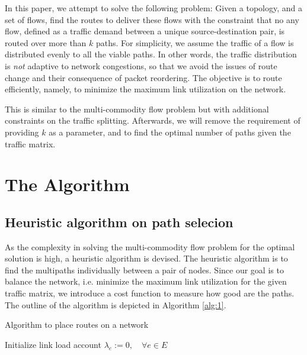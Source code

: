 \documentclass[conference]{IEEEtran}
\begin{document}
In this paper, we attempt to solve the following problem: Given a topology, and
a set of flows, find the routes to deliver these flows with the constraint that
no any flow, defined as a traffic demand between a unique source-destination
pair, is routed over more than $k$ paths. For simplicity, we assume the traffic
of a flow is distributed evenly to all the viable paths. In other words, the
traffic distribution is \emph{not} adaptive to network congestions, so that we
avoid the issues of route change and their consequence of packet reordering.
The objective is to route efficiently, namely, to minimize the maximum link
utilization on the network.

This is similar to the multi-commodity flow problem \cite{pm04} but with
additional constraints on the traffic splitting. Afterwards, we will remove the
requirement of providing $k$ as a parameter, and to find the optimal number of
paths given the traffic matrix.

\section{The Algorithm}\label{sec:algo}

\subsection{Heuristic algorithm on path selecion}
As the complexity in solving the multi-commodity flow problem for the optimal
solution is high, a heuristic algorithm is devised. The heuristic algorithm is
to find the multipaths individually between a pair of nodes. Since our goal is
to balance the network, i.e. minimize the maximum link utilization for the
given traffic matrix, we introduce a cost function to measure how good are the
paths. The outline of the algorithm is depicted in Algorithm \ref{alg:1}.

\begin{algorithm}
\caption{Algorithm to place routes on a network}\label{alg:1}
Initialize link load account $\lambda_e :=0,\quad\forall e\in E$\;
\end{algorithm}
\end{document}
